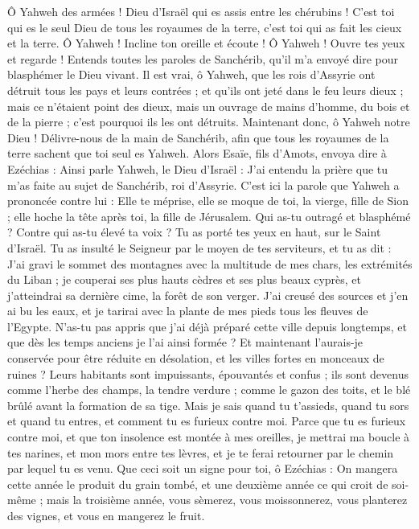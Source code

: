 \begin{multicols}{2}
Ô Yahweh des armées ! Dieu d'Israël qui es assis entre les chérubins ! C'est toi qui es le seul Dieu de tous les royaumes de la terre, c'est toi qui as fait les cieux et la terre.
Ô Yahweh ! Incline ton oreille et écoute ! Ô Yahweh ! Ouvre tes yeux et regarde ! Entends toutes les paroles de Sanchérib, qu'il m'a envoyé dire pour blasphémer le Dieu vivant.
Il est vrai, ô Yahweh, que les rois d'Assyrie ont détruit tous les pays et leurs contrées ;
et qu'ils ont jeté dans le feu leurs dieux ; mais ce n'étaient point des dieux, mais un ouvrage de mains d'homme, du bois et de la pierre ; c'est pourquoi ils les ont détruits.
Maintenant donc, ô Yahweh notre Dieu ! Délivre-nous de la main de Sanchérib, afin que tous les royaumes de la terre sachent que toi seul es Yahweh.
Alors Esaïe, fils d'Amots, envoya dire à Ezéchias : Ainsi parle Yahweh, le Dieu d'Israël : J'ai entendu la prière que tu m'as faite au sujet de Sanchérib, roi d'Assyrie.
C'est ici la parole que Yahweh a prononcée contre lui : Elle te méprise, elle se moque de toi, la vierge, fille de Sion ; elle hoche la tête après toi, la fille de Jérusalem.
Qui as-tu outragé et blasphémé ? Contre qui as-tu élevé ta voix ? Tu as porté tes yeux en haut, sur le Saint d'Israël.
Tu as insulté le Seigneur par le moyen de tes serviteurs, et tu as dit : J'ai gravi le sommet des montagnes avec la multitude de mes chars, les extrémités du Liban ; je couperai ses plus hauts cèdres et ses plus beaux cyprès, et j'atteindrai sa dernière cime, la forêt de son verger.
J'ai creusé des sources et j'en ai bu les eaux, et je tarirai avec la plante de mes pieds tous les fleuves de l'Egypte.
N'as-tu pas appris que j'ai déjà préparé cette ville depuis longtemps, et que dès les temps anciens je l'ai ainsi formée ? Et maintenant l'aurais-je conservée pour être réduite en désolation, et les villes fortes en monceaux de ruines ?
Leurs habitants sont impuissants, épouvantés et confus ; ils sont devenus comme l'herbe des champs, la tendre verdure ; comme le gazon des toits, et le blé brûlé avant la formation de sa tige.
Mais je sais quand tu t'assieds, quand tu sors et quand tu entres, et comment tu es furieux contre moi.
Parce que tu es furieux contre moi, et que ton insolence est montée à mes oreilles, je mettrai ma boucle à tes narines, et mon mors entre tes lèvres, et je te ferai retourner par le chemin par lequel tu es venu.
Que ceci soit un signe pour toi, ô Ezéchias : On mangera cette année le produit du grain tombé, et une deuxième année ce qui croit de soi-même ; mais la troisième année, vous sèmerez, vous moissonnerez, vous planterez des vignes, et vous en mangerez le fruit.

\end{multicols}
